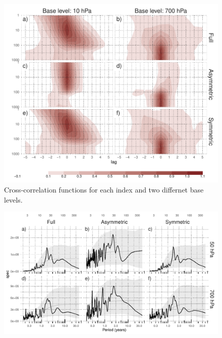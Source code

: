 \documentclass[]{ametsocV5}
\begin{document}
\begin{figure}
\includegraphics{A2 ccf-levels-1} \caption[Cross-correlation functions for each index and two differnet base levels]{Cross-correlation functions for each index and two differnet base levels.}\label{fig:A2 ccf-levels}
\end{figure}

\begin{figure}
\includegraphics{A3-1} \label{fig:A3}
\end{figure}
\end{document}
